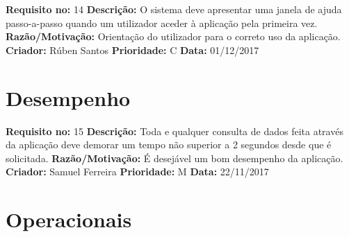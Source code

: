 \begin{framed}
\noindent\textbf{Requisito no:} 14
\vspace{2mm}
\newline\textbf{Descrição:} O sistema deve apresentar uma janela de ajuda passo-a-passo quando um utilizador aceder à aplicação pela primeira vez.
\vspace{1mm}
\newline\textbf{Razão/Motivação:} Orientação do utilizador para o correto uso da aplicação.
\vspace{1mm}
\newline\textbf{Criador:} Rúben Santos
\vspace{1mm}
\newline\textbf{Prioridade:} C
\vspace{1mm}
\newline\textbf{Data:} 01/12/2017
\end{framed}

\section{Desempenho}

\begin{framed}
\noindent\textbf{Requisito no:} 15
\vspace{2mm}
\newline\textbf{Descrição:} Toda e qualquer consulta de dados feita através da aplicação deve demorar um tempo não superior a 2 segundos desde que é solicitada.
\vspace{1mm}
\newline\textbf{Razão/Motivação:} É desejável um bom desempenho da aplicação.
\vspace{1mm}
\newline\textbf{Criador:} Samuel Ferreira 
\vspace{1mm}
\newline\textbf{Prioridade:} M
\vspace{1mm}
\newline\textbf{Data:} 22/11/2017
\end{framed}

\newpage

\section{Operacionais}

